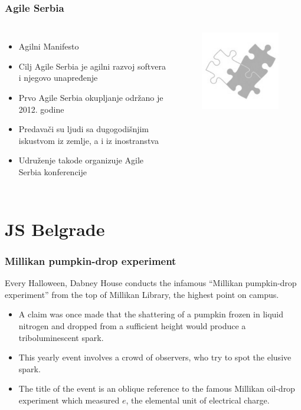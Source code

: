 \documentclass[hyperref={bookmarks=false},aspectratio=169]{beamer}
\begin{document}
\begin{frame}
\frametitle{Agile Serbia}

\begin{columns}[T]

\begin{itemize}
    \item Agilni Manifesto
    \item Cilj Agile Serbia je agilni razvoj softvera i njegovo unapređenje
    \item Prvo Agile Serbia okupljanje održano je 2012. godine
    \item Predavači su ljudi sa dugogodišnjim iskustvom iz zemlje, a i iz inostranstva
    \item Udruženje takode organizuje Agile Serbia konferencije 
\end{itemize}



\begin{figure}
    \raggedleft
    \includegraphics[scale=0.4]{./images/agile_srb.png}
\end{figure}

\end{columns}
\end{frame}

\section{JS Belgrade}

\begin{frame}
\frametitle{Millikan pumpkin-drop experiment}
Every Halloween, Dabney House conducts the infamous ``Millikan pumpkin-drop experiment'' from the top of Millikan Library, the highest point on campus.

\begin{itemize}
    \item A claim was once made that the shattering of a pumpkin frozen in liquid nitrogen and dropped from a sufficient height would produce a triboluminescent spark. 
    \item This yearly event involves a crowd of observers, who try to spot the elusive spark.
    \item The title of the event is an oblique reference to the famous Millikan oil-drop experiment which measured $e$, the elemental unit of electrical charge.
\end{itemize}

\end{frame}
\end{document}
